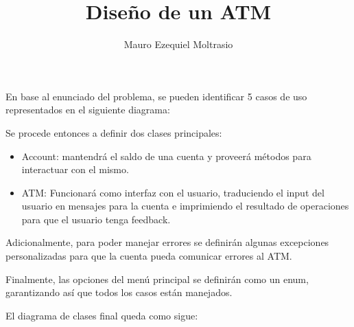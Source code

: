 \documentclass{article}
\author{Mauro Ezequiel Moltrasio}
\title{Diseño de un ATM}
\begin{document}
\maketitle

En base al enunciado del problema, se pueden identificar 5 casos de uso
representados en el siguiente diagrama:

\begin{figure}[H]
    \centering
    \scalebox{.5}{
        
    }
\end{figure}

Se procede entonces a definir dos clases principales:
\begin{itemize}
    \item Account: mantendrá el saldo de una cuenta y proveerá métodos para
        interactuar con el mismo.
    \item ATM: Funcionará como interfaz con el usuario, traduciendo el input
        del usuario en mensajes para la cuenta e imprimiendo el resultado de
        operaciones para que el usuario tenga feedback.
\end{itemize}

Adicionalmente, para poder manejar errores se definirán algunas excepciones
personalizadas para que la cuenta pueda comunicar errores al ATM.

Finalmente, las opciones del menú principal se definirán como un enum,
garantizando así que todos los casos están manejados.

El diagrama de clases final queda como sigue:

\begin{figure}[H]
    \centering
    \scalebox{.5}{
        
    }
\end{figure}
\end{document}
